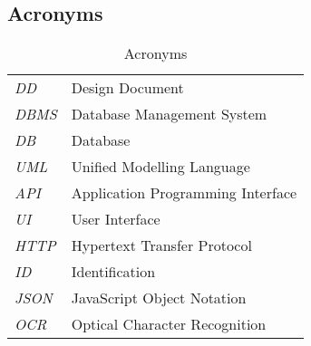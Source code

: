 \subsection{Acronyms}

\begin{center}
\setlength\tabcolsep{7pt}
\renewcommand{\arraystretch}{2}
\begin{longtable}{|m{1.5cm}|m{8.6cm}|}
\caption{Acronyms}\\
\hline
\endfirsthead
\endhead
\hline
\endlastfoot
\hline
\textit{DD} & Design Document\\
\textit{DBMS} & Database Management System\\ 
\textit{DB} & Database\\
\textit{UML} & Unified Modelling Language\\
\textit{API} & Application Programming Interface\\
\textit{UI} & User Interface\\
\textit{HTTP} & Hypertext Transfer Protocol\\
\textit{ID} & Identification\\
\textit{JSON} & JavaScript Object Notation\\
\textit{OCR} & Optical Character Recognition\\
\hline
\end{longtable}
\end{center}